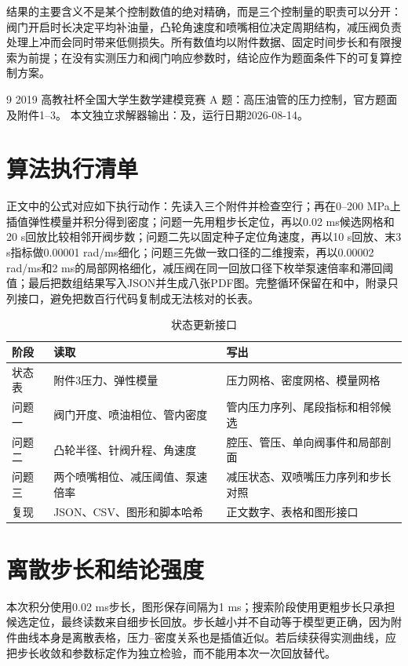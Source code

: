 \documentclass[UTF8,11pt,a4paper]{ctexart}
\begin{document}
结果的主要含义不是某个控制数值的绝对精确，而是三个控制量的职责可以分开：阀门开启时长决定平均补油量，凸轮角速度和喷嘴相位决定周期结构，减压阀负责处理上冲而会同时带来低侧损失。所有数值均以附件数据、固定时间步长和有限搜索为前提；在没有实测压力和阀门响应参数时，结论应作为题面条件下的可复算控制方案。
\label{mcm-body-end}

\begin{thebibliography}{9}
 2019 高教社杯全国大学生数学建模竞赛 A 题：高压油管的压力控制，官方题面及附件1--3。
 本文独立求解器输出：及，运行日期2026-08-14。
\end{thebibliography}

\appendix
\section{算法执行清单}
正文中的公式对应如下执行动作：先读入三个附件并检查空行；再在0--200 MPa上插值弹性模量并积分得到密度；问题一先用粗步长定位，再以0.02 ms候选网格和20 s回放比较相邻开阀步数；问题二先以固定种子定位角速度，再以10 s回放、末3 s指标做0.00001 rad/ms细化；问题三先做一致口径的二维搜索，再以0.00002 rad/ms和2 ms的局部网格细化，减压阀在同一回放口径下枚举泵速倍率和滞回阈值；最后把数组结果写入JSON并生成八张PDF图。完整循环保留在和中，附录只列接口，避免把数百行代码复制成无法核对的长表。

\begin{longtable}{p{3.2cm}p{5.3cm}p{6.2cm}}
\caption{状态更新接口}\label{tab:algorithm-a}\\
\toprule
阶段 & 读取 & 写出\\
\midrule
状态表 & 附件3压力、弹性模量 & 压力网格、密度网格、模量网格\\
问题一 & 阀门开度、喷油相位、管内密度 & 管内压力序列、尾段指标和相邻候选\\
问题二 & 凸轮半径、针阀升程、角速度 & 腔压、管压、单向阀事件和局部剖面\\
问题三 & 两个喷嘴相位、减压阈值、泵速倍率 & 减压状态、双喷嘴压力序列和步长对照\\
复现 & JSON、CSV、图形和脚本哈希 & 正文数字、表格和图形接口\\
\bottomrule
\end{longtable}

\section{离散步长和结论强度}
本次积分使用0.02 ms步长，图形保存间隔为1 ms；搜索阶段使用更粗步长只承担候选定位，最终读数来自细步长回放。步长越小并不自动等于模型更正确，因为附件曲线本身是离散表格，压力--密度关系也是插值近似。若后续获得实测曲线，应把步长收敛和参数标定作为独立检验，而不能用本次一次回放替代。
\end{document}
